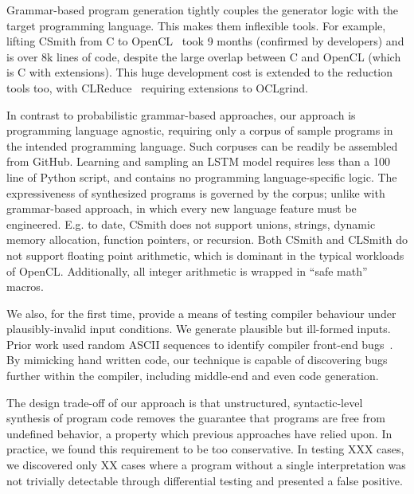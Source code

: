 Grammar-based program generation tightly couples the generator logic with the target programming language. This makes them inflexible tools. For example, lifting CSmith from C to OpenCL~\cite{Lidbury2015a} took 9 months (confirmed by developers) and is over 8k lines of code, despite the large overlap between C and OpenCL (which is C with extensions). This huge development cost is extended to the reduction tools too, with CLReduce~\cite{Pflanzer2016} requiring extensions to OCLgrind.


In contrast to probabilistic grammar-based approaches, our approach is programming language agnostic, requiring only a corpus of sample programs in the intended programming language. Such corpuses can be readily be assembled from GitHub. Learning and sampling an LSTM model requires less than a 100 line of Python script, and contains no programming language-specific logic. The expressiveness of synthesized programs is governed by the corpus; unlike with grammar-based approach, in which every new language feature must be engineered. E.g. to date, CSmith does not support unions, strings, dynamic memory allocation, function pointers, or recursion. Both CSmith and CLSmith do not support floating point arithmetic, which is dominant in the typical workloads of OpenCL. Additionally, all integer arithmetic is wrapped in ``safe math'' macros.

We also, for the first time, provide a means of testing compiler behaviour under plausibly-invalid input conditions. We generate plausible but ill-formed inputs. Prior work used random ASCII sequences to identify compiler front-end bugs~\cite{McKeeman1998}. By mimicking hand written code, our technique is capable of discovering bugs further within the compiler, including middle-end and even code generation.

The design trade-off of our approach is that unstructured, syntactic-level synthesis of program code removes the guarantee that programs are free from undefined behavior, a property which previous approaches have relied upon. In practice, we found this requirement to be too conservative. In testing XXX cases, we discovered only XX cases where a program without a single interpretation was not trivially detectable through differential testing and presented a false positive.

